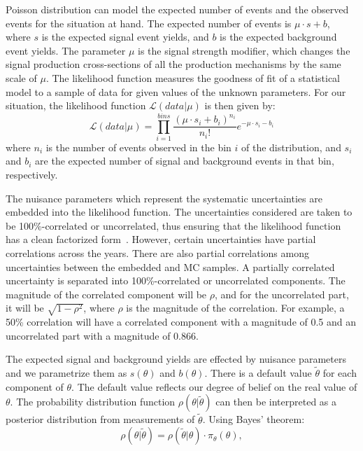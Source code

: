 Poisson distribution can model the expected number of events and the observed events for the situation at hand. The expected number of events is $\mu\cdot s + b$, where $s$ is the expected signal event yields, and $b$ is the expected background event yields. The parameter $\mu$ is the signal strength modifier, which changes the signal production cross-sections of all the production mechanisms by the same scale of $\mu$. The likelihood function measures the goodness of fit of a statistical model to a sample of data for given values of the unknown parameters. For our situation, the likelihood function $\mathcal{L}(data|\mu)$ is then given by:
\begin{equation}
  \mathcal{L}(data|\mu)=\prod_{i=1}^{bins}\frac{(\mu\cdot s_i + b_i)^{n_i}}{n_{i}!}e^{-\mu\cdot s_i - b_i}
\end{equation}
where $n_i$ is the number of events observed in the bin $i$ of the distribution, and $s_i$ and $b_i$ are the expected number of signal and background events in that bin, respectively.

The nuisance parameters which represent the systematic uncertainties are embedded into the likelihood function. The uncertainties considered are taken to be 100\%-correlated or uncorrelated, thus ensuring that the likelihood function has a clean factorized form~\cite{ATLAS:2011tau}. However, certain uncertainties have partial correlations across the years. There are also partial correlations among uncertainties between the embedded and MC samples. A partially correlated uncertainty is separated into 100\%-correlated or uncorrelated components.
The magnitude of the correlated component will be $\rho$, and for the uncorrelated part, it will be $\sqrt{1-\rho^{2}}$, where $\rho$ is the magnitude of the correlation. For example, a 50\% correlation will have a correlated component with a magnitude of 0.5 and an uncorrelated part with a magnitude of 0.866.

The expected signal and background yields are effected by nuisance parameters and we parametrize them as $s(\theta)$ and $b(\theta)$. There is a default value $\tilde{\theta}$ for each component of $\theta$. The default value reflects our degree of belief on the real value of $\theta$. The probability distribution function $\rho(\theta|\tilde{\theta})$ can then be interpreted as a posterior distribution from measurements of $\tilde{\theta}$. Using Bayes' theorem:
\begin{equation}
  \rho(\theta|\tilde{\theta})=\rho(\tilde{\theta}|\theta)\cdot\pi_\theta(\theta),
\end{equation}

